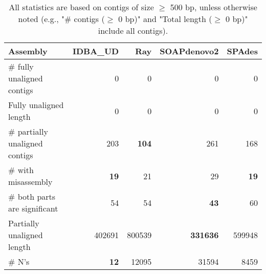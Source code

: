 \documentclass[12pt,a4paper]{article}
\begin{document}
\begin{table}[ht]
\begin{center}
\caption{All statistics are based on contigs of size $\geq$ 500 bp, unless otherwise noted (e.g., "\# contigs ($\geq$ 0 bp)" and "Total length ($\geq$ 0 bp)" include all contigs).}
\begin{tabular}{|l*{4}{|r}|}
\hline
Assembly & IDBA\_UD & Ray & SOAPdenovo2 & SPAdes \\ \hline
\# fully unaligned contigs & 0 & 0 & 0 & 0 \\ \hline
Fully unaligned length & 0 & 0 & 0 & 0 \\ \hline
\# partially unaligned contigs & 203 & {\bf 104} & 261 & 168 \\ \hline
\hspace{5mm}\# with misassembly & {\bf 19} & 21 & 29 & {\bf 19} \\ \hline
\hspace{5mm}\# both parts are significant & 54 & 54 & {\bf 43} & 60 \\ \hline
Partially unaligned length & 402691 & 800539 & {\bf 331636} & 599948 \\ \hline
\# N's & {\bf 12} & 12095 & 31594 & 8459 \\ \hline
\end{tabular}
\end{center}
\end{table}
\end{document}
